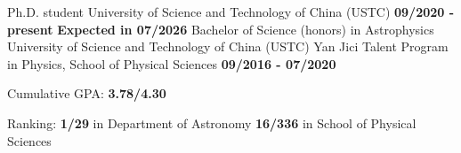 
\begin{cventries}
  \cventry
    {\textnormal{Ph.D. student }}
    {University of Science and Technology of China (USTC)}
    {\textcolor{awesome-emerald}{\textbf{09/2020 - present}}}
    {\textcolor{awesome-emerald}{\textbf{Expected in 07/2026}}}
    {}
  \cventry
    {\textnormal{Bachelor of Science (honors) in Astrophysics}} 
    {University of Science and Technology of China (USTC)\newline
    \textnormal{Yan Jici Talent Program in Physics, School of Physical Sciences}} 
    {\textcolor{awesome-emerald}{\textbf{09/2016 - 07/2020}}}
    {\textcolor{awesome-emerald}{\textbf{}}}
    {
      \begin{cvitems} %
         \item{\textnormal{Cumulative GPA:} \textbf{3.78/4.30}}
         \item{\textnormal{Ranking:} \textbf{1/29} \textnormal{in Department of Astronomy}
         \newline
         \hspace{1.3cm}\textbf{16/336} \textnormal{in School of Physical Sciences}}
      \end{cvitems}
    }
  \vspace{-0.4cm}
\end{cventries}
